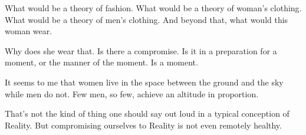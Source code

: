 

﻿What would be a theory of fashion.  What would be a theory of woman's
clothing.  What would be a theory of men’s clothing.  And beyond that,
what would this woman wear.

Why does she wear that.  Is there a compromise.  Is it in a
preparation for a moment, or the manner of the moment.  Is a moment.

It seems to me that women live in the space between the ground and the
sky while men do not.  Few men, so few, achieve an altitude in
proportion.

That's not the kind of thing one should say out loud in a typical
conception of Reality.  But compromising ourselves to Reality is not
even remotely healthy.

\bye

